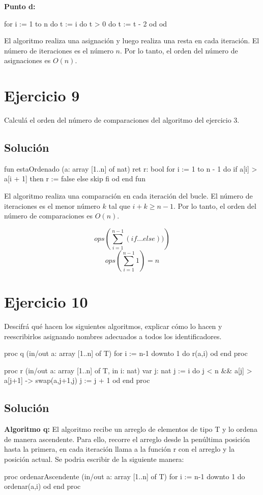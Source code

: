 \documentclass{article}
\newcounter{ejer}[section]
\begin{document}
\textbf{Punto d:}
\begin{pascallike}
for i := 1 to n do
  t := i
  do t > 0 do
    t := t - 2
  od
od
\end{pascallike}
El algoritmo realiza una asignación y luego realiza una resta en cada iteración. El número de iteraciones es el número $n$. Por lo tanto, el orden del número de asignaciones es $O(n)$.

\section*{Ejercicio 9}
Calculá el orden del número de comparaciones del algoritmo del ejercicio 3.

\subsection*{Solución}
\begin{pascallike}
fun estaOrdenado (a: array [1..n] of nat) ret r: bool
  for i := 1 to n - 1 do
    if a[i] > a[i + 1] then
      r := false
    else
      skip
    fi
  od
end fun
\end{pascallike}
El algoritmo realiza una comparación en cada iteración del bucle. El número de iteraciones es el menor número $k$ tal que $i + k \geq n-1$. Por lo tanto, el orden del número de comparaciones es $O(n)$.

$$ ops\left( \sum_{i=1}^{n-1} (if...else)) \right)$$
$$ ops\left( \sum_{i=1}^{n-1} 1 \right) = n$$

\section*{Ejercicio 10}
Descifrá qué hacen los siguientes algoritmos, explicar cómo lo hacen y reescribirlos asignando nombres adecuados a todos los identificadores.
\begin{pascallike}
proc q (in/out a: array [1..n] of T)
  for i := n-1 downto 1 do
    r(a,i)
  od
end proc
\end{pascallike}

\begin{pascallike}
proc r (in/out a: array [1..n] of T, in i: nat)
  var j: nat
  j := i
  do j < n && a[j] > a[j+1] ->
    swap(a,j+1,j)
    j := j + 1
  od
end proc
\end{pascallike}

\subsection*{Solución}
\textbf{Algoritmo q:} El algoritmo recibe un arreglo de elementos de tipo T y lo ordena de manera ascendente. Para ello, recorre el arreglo desde la penúltima posición hasta la primera, en cada iteración llama a la función r con el arreglo y la posición actual.
Se podria escribir de la siguiente manera:
\begin{pascallike}
proc ordenarAscendente (in/out a: array [1..n] of T)
  for i := n-1 downto 1 do
    ordenar(a,i)
  od
end proc
\end{pascallike}
\end{document}
